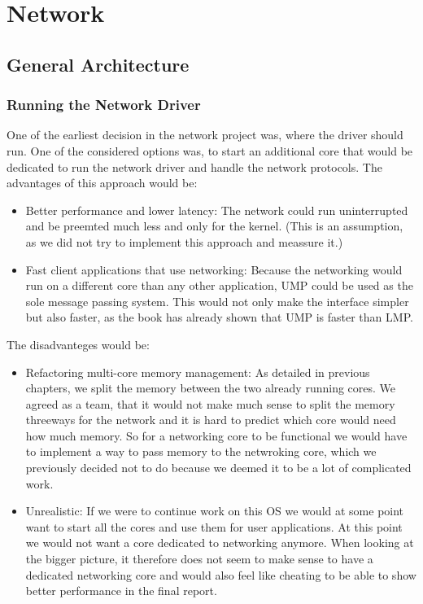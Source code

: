 \chapter{Network}

\section{General Architecture}

\subsection{Running the Network Driver}

One of the earliest decision in the network project was, where the driver should run. One of the considered options was, to start an additional core that would be dedicated to run the network driver and handle the network protocols. The advantages of this approach would be:
\begin{itemize}
    \item Better performance and lower latency: The network could run uninterrupted and be preemted much less and only for the kernel. (This is an assumption, as we did not try to implement this approach and meassure it.)
    \item Fast client applications that use networking: Because the networking would run on a different core than any other application, UMP could be used as the sole message passing system. This would not only make the interface simpler but also faster, as the book has already shown that UMP is faster than LMP.
\end{itemize}
The disadvanteges would be:
\begin{itemize}
    \item Refactoring multi-core memory management: As detailed in previous chapters, we split the memory between the two already running cores. We agreed as a team, that it would not make much sense to split the memory threeways for the network and it is hard to predict which core would need how much memory. So for a networking core to be functional we would have to implement a way to pass memory to the netwroking core, which we previously decided not to do because we deemed it to be a lot of complicated work.
    \item Unrealistic: If we were to continue work on this OS we would at some point want to start all the cores and use them for user applications. At this point we would not want a core dedicated to networking anymore. When looking at the bigger picture, it therefore does not seem to make sense to have a dedicated networking core and would also feel like cheating to be able to show better performance in the final report.
\end{itemize}

